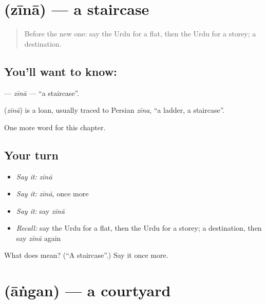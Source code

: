 \section[\texorpdfstring{\ur{زینہ} (zīnā)}{زینہ (zīnā)}]{ (zīnā) — a staircase}

\label{lesson:UR-C219-zina}



\begin{quote}
Before the new one: say the Urdu for a flat, then the Urdu for a storey; a destination.
\end{quote}

\subsection*{You'll want to know: }
\textbf{} — \emph{zīnā} — \textquotedblleft{}a staircase\textquotedblright{}.

\begin{cousinweb}
\textbf{} (\emph{zīnā}) is a loan, usually traced to Persian \emph{zīna}, \textquotedblleft{}a ladder, a staircase\textquotedblright{}.
\end{cousinweb}

\begin{grammarlens}[title={What you've built}]
One more word for this chapter.
\end{grammarlens}

\subsection*{Your turn}
\begin{itemize}
\raggedright
  \item \emph{Say it:} \emph{zīnā}
  \item \emph{Say it:} \emph{zīnā}, once more
  \item \emph{Say it:} say \emph{zīnā}
  \item \emph{Recall:} say the Urdu for a flat, then the Urdu for a storey; a destination, then say \emph{zīnā} again
\end{itemize}

\begin{tcolorbox}[breakable,colback=teal!4,colframe=teal!35!black,title={Before you move on}]
What does  mean? (\textquotedblleft{}A staircase\textquotedblright{}.) Say it once more.
\end{tcolorbox}
\section[\texorpdfstring{\ur{آنگن} (āṅgan)}{آنگن (āṅgan)}]{ (āṅgan) — a courtyard}

